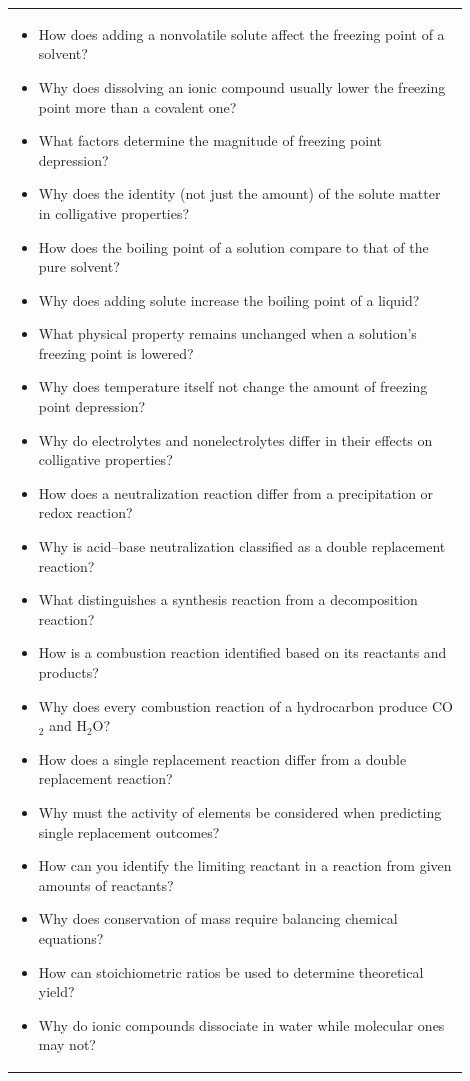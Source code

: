 \documentclass{article}
\begin{document}
\begin{tabular}{|p{0.9\linewidth}|}
\hline
\begin{itemize}
\item How does adding a nonvolatile solute affect the freezing point of a solvent?
\item Why does dissolving an ionic compound usually lower the freezing point more than a covalent one?
\item What factors determine the magnitude of freezing point depression?
\item Why does the identity (not just the amount) of the solute matter in colligative properties?
\item How does the boiling point of a solution compare to that of the pure solvent?
\item Why does adding solute increase the boiling point of a liquid?
\item What physical property remains unchanged when a solution’s freezing point is lowered?
\item Why does temperature itself not change the amount of freezing point depression?
\item Why do electrolytes and nonelectrolytes differ in their effects on colligative properties?
\item How does a neutralization reaction differ from a precipitation or redox reaction?
\item Why is acid–base neutralization classified as a double replacement reaction?
\item What distinguishes a synthesis reaction from a decomposition reaction?
\item How is a combustion reaction identified based on its reactants and products?
\item Why does every combustion reaction of a hydrocarbon produce CO$_2$ and H$_2$O?
\item How does a single replacement reaction differ from a double replacement reaction?
\item Why must the activity of elements be considered when predicting single replacement outcomes?
\item How can you identify the limiting reactant in a reaction from given amounts of reactants?
\item Why does conservation of mass require balancing chemical equations?
\item How can stoichiometric ratios be used to determine theoretical yield?
\item Why do ionic compounds dissociate in water while molecular ones may not?

\end{itemize}
\end{tabular}
\end{document}
